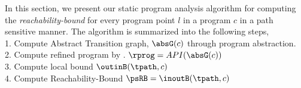 In this section, we present our static program analysis algorithm for computing 
the \emph{reachability-bound} for every program point $l$ in a program $c$ in a path sensitive manner.
%
The algorithm is summarized into the following steps,
%
\\
    1. Compute Abstract Transition graph, $\absG(c)$ through program abstraction.
    \\
    2. Compute refined program by \cite{GulwaniJK09}. $\rprog = API(\absG(c))$
    \\
    3. Compute local bound $\outinB(\tpath, c)$
    \\
    4. Compute Reachability-Bound $\psRB = \inoutB(\tpath, c)$
%
